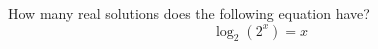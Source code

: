 \documentclass{ximera}
\author{David Kish}
\begin{document}
\begin{exercise}
How many real solutions does the following equation have? \\
\[
\log_2{\left(2^x\right)}=x
\]
\begin{multipleChoice}  
\end{multipleChoice}  
\end{exercise}
\end{document}
